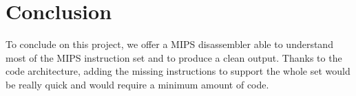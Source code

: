 \section*{Conclusion}

To conclude on this project, we offer a MIPS disassembler able to understand most of the MIPS instruction set and to produce a clean output. Thanks to the code architecture, adding the missing instructions to support the whole set would be really quick and would require a minimum amount of code. 